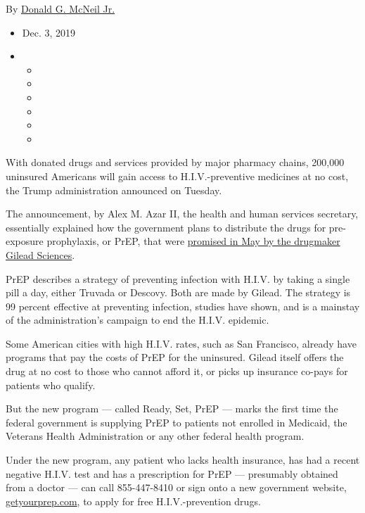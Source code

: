 By
\href{https://www.nytimes3xbfgragh.onion/by/donald-g-mcneil-jr}{Donald
G. McNeil Jr.}

\begin{itemize}
\item
  Dec. 3, 2019
\item
  \begin{itemize}
  \item
  \item
  \item
  \item
  \item
  \item
  \end{itemize}
\end{itemize}

With donated drugs and services provided by major pharmacy chains,
200,000 uninsured Americans will gain access to H.I.V.-preventive
medicines at no cost, the Trump administration announced on Tuesday.

The announcement, by Alex M. Azar II, the health and human services
secretary, essentially explained how the government plans to distribute
the drugs for pre-exposure prophylaxis, or PrEP, that were
\href{https://www.nytimes3xbfgragh.onion/2019/05/09/health/gilead-truvada-hiv-aids.html}{promised
in May by the drugmaker Gilead Sciences}.

PrEP describes a strategy of preventing infection with H.I.V. by taking
a single pill a day, either Truvada or Descovy. Both are made by Gilead.
The strategy is 99 percent effective at preventing infection, studies
have shown, and is a mainstay of the administration's campaign to end
the H.I.V. epidemic.

Some American cities with high H.I.V. rates, such as San Francisco,
already have programs that pay the costs of PrEP for the uninsured.
Gilead itself offers the drug at no cost to those who cannot afford it,
or picks up insurance co-pays for patients who qualify.

But the new program --- called Ready, Set, PrEP --- marks the first time
the federal government is supplying PrEP to patients not enrolled in
Medicaid, the Veterans Health Administration or any other federal health
program.

Under the new program, any patient who lacks health insurance, has had a
recent negative H.I.V. test and has a prescription for PrEP ---
presumably obtained from a doctor --- can call 855-447-8410 or sign onto
a new government website,
\href{https://www.getyourprep.com/}{getyourprep.com}, to apply for free
H.I.V.-prevention drugs.

